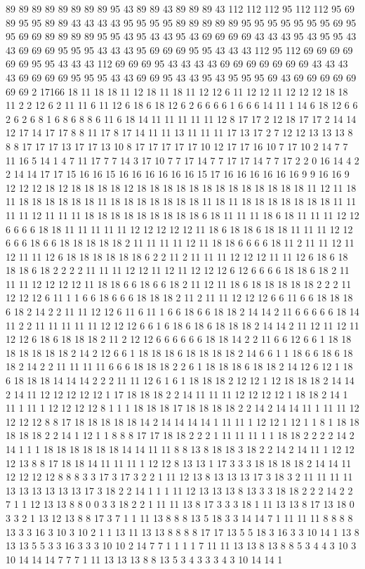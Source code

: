 89 89 89 89 89 89 89 89 95 43 89 89 43 89 89 89 43 112 112 112 95 112 112 95 69 89 95 95 89 89 43 43 43 43 95 95 95 95 89 89 89 89 89 95 95 95 95 95 95 95 69 95 95 69 69 89 89 89 89 95 95 43 95 43 43 95 43 69 69 69 69 43 43 43 95 43 95 95 43 43 69 69 69 95 95 95 43 43 43 95 69 69 69 95 95 43 43 43 112 95 112 69 69 69 69 69 69 95 95 43 43 43 112 69 69 69 95 43 43 43 43 69 69 69 69 69 69 69 43 43 43 43 69 69 69 69 95 95 95 43 43 69 69 95 43 43 95 43 95 95 95 69 43 69 69 69 69 69 69 69 2 17166 18 11 18 18 11 12 18 11 18 11 12 12 6 11 12 12 11 12 12 12 18 18 11 2 2 12 6 2 11 11 6 11 12 6 18 6 18 12 6 2 6 6 6 6 1 6 6 6 14 11 1 14 6 18 12 6 6 2 6 2 6 8 1 6 8 6 8 8 6 11 6 18 14 11 11 11 11 11 12 8 17 17 2 12 18 17 17 2 14 14 12 17 14 17 17 8 8 11 17 8 17 14 11 11 13 11 11 11 17 13 17 2 7 12 12 13 13 13 8 8 8 17 17 17 13 17 17 13 10 8 17 17 17 17 17 10 12 17 17 16 10 7 17 10 2 14 7 7 11 16 5 14 1 4 7 11 17 7 7 14 3 17 10 7 7 17 14 7 7 17 17 14 7 7 17 2 2 0 16 14 4 2 2 14 14 17 17 15 16 16 15 16 16 16 16 16 16 15 17 16 16 16 16 16 16 9 9 16 16 9 12 12 12 18 12 18 18 18 18 12 18 18 18 18 18 18 18 18 18 18 18 18 18 11 12 11 18 11 18 18 18 18 18 18 11 18 18 18 18 18 18 18 11 18 11 18 18 18 18 18 18 18 11 11 11 11 12 11 11 11 18 18 18 18 18 18 18 18 18 6 18 11 11 11 18 6 18 11 11 11 12 12 6 6 6 6 18 18 11 11 11 11 11 12 12 12 12 12 11 18 6 18 18 6 18 18 11 11 11 12 12 6 6 6 18 6 6 18 18 18 18 18 2 11 11 11 11 12 11 18 18 6 6 6 6 18 11 2 11 11 12 11 12 11 11 12 6 18 18 18 18 18 18 6 2 2 11 2 11 11 11 12 12 12 11 11 12 6 18 6 18 18 18 6 18 2 2 2 2 11 11 11 12 12 11 12 11 12 12 12 6 12 6 6 6 6 18 18 6 18 2 11 11 11 12 12 12 12 11 18 18 6 6 18 6 6 18 2 11 12 11 18 6 18 18 18 18 18 2 2 2 11 12 12 12 6 11 1 1 6 6 18 6 6 6 18 18 18 2 11 2 11 11 12 12 12 6 6 11 6 6 18 18 18 6 18 2 14 2 2 11 11 12 12 6 11 6 11 1 6 6 18 6 6 18 18 2 14 14 2 11 6 6 6 6 6 18 14 11 2 2 11 11 11 11 11 12 12 12 6 6 1 6 18 6 18 6 18 18 18 2 14 14 2 11 12 11 12 11 12 12 6 18 6 18 18 18 2 11 2 12 12 6 6 6 6 6 6 18 18 14 2 2 11 6 6 12 6 6 1 18 18 18 18 18 18 18 2 14 2 12 6 6 1 18 18 18 6 18 18 18 18 2 14 6 6 1 1 18 6 6 18 6 18 18 2 14 2 2 11 11 11 11 6 6 6 18 18 18 2 2 6 1 18 18 18 6 18 18 2 14 12 6 12 1 18 6 18 18 18 14 14 14 2 2 2 11 11 12 6 1 6 1 18 18 18 2 12 12 1 12 18 18 18 2 14 14 2 14 11 12 12 12 12 12 1 17 18 18 18 2 2 14 11 11 11 12 12 12 12 1 18 18 2 14 1 11 1 11 1 12 12 12 12 8 1 1 1 18 18 18 17 18 18 18 18 2 2 14 2 14 14 11 1 11 11 12 12 12 12 8 8 17 18 18 18 18 18 14 2 14 14 14 14 1 11 11 1 12 12 1 12 1 1 8 1 18 18 18 18 18 2 2 14 1 12 1 1 8 8 8 17 17 18 18 2 2 2 1 11 11 11 1 1 18 18 2 2 2 2 14 2 14 1 1 1 18 18 18 18 18 18 14 14 11 11 8 8 13 8 18 18 3 18 2 2 14 2 14 11 1 12 12 12 13 8 8 17 18 18 14 11 11 11 1 12 12 8 13 13 1 17 3 3 3 18 18 18 18 2 14 14 11 12 12 12 12 8 8 8 3 3 17 3 17 3 2 2 1 11 12 13 8 13 13 13 17 3 18 3 2 11 11 11 11 13 13 13 13 13 13 17 3 18 2 2 14 1 1 1 11 12 13 13 13 8 13 3 3 18 18 2 2 2 14 2 2 7 1 1 12 13 13 8 8 0 0 3 3 18 2 2 1 11 11 13 8 17 3 3 3 18 1 11 13 13 8 17 13 18 0 3 3 2 1 13 12 13 8 8 17 3 7 1 1 11 13 8 8 8 13 5 18 3 3 14 14 7 1 11 11 11 8 8 8 8 13 3 3 16 3 10 3 10 2 1 1 13 11 13 13 8 8 8 8 17 17 13 5 5 18 3 16 3 3 10 14 1 13 8 13 13 5 5 3 3 16 3 3 3 10 10 2 14 7 7 1 1 1 1 7 11 11 13 13 8 13 8 8 5 3 4 4 3 10 3 10 14 14 14 7 7 7 1 11 13 13 13 8 8 13 5 3 4 3 3 3 4 3 10 14 14 1 